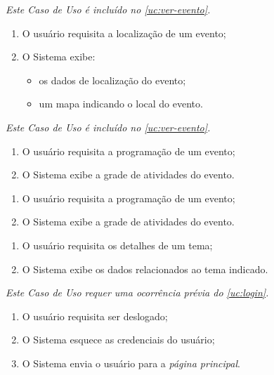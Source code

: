 \documentclass[12pt,a4paper,twoside,hyphens,english,brazil]{abntex2}
\begin{document}
{
\emph{Este Caso de Uso é incluído no \ref{uc:ver-evento}.}
\begin{enumerate}[itemsep=-1ex,topsep=-1ex]
	\item O usuário requisita a localização de um evento;
	\item O Sistema exibe:
		\begin{itemize}[itemsep=-1ex,topsep=-1ex]
			\item os dados de localização do evento;
			\item um mapa indicando o local do evento.
		\end{itemize}
\end{enumerate}

\emph{Este Caso de Uso é incluído no \ref{uc:ver-evento}.}
\begin{enumerate}[itemsep=-1ex,topsep=-1ex]
	\item O usuário requisita a programação de um evento;
	\item O Sistema exibe a grade de atividades do evento.
\end{enumerate}

\begin{enumerate}[itemsep=-1ex]
	\item O usuário requisita a programação de um evento;
	\item O Sistema exibe a grade de atividades do evento.
\end{enumerate}

\begin{enumerate}[itemsep=-1ex]
	\item O usuário requisita os detalhes de um tema;
	\item O Sistema exibe os dados relacionados ao tema indicado.
\end{enumerate}

\emph{Este Caso de Uso requer uma ocorrência prévia do \ref{uc:login}.}
\begin{enumerate}[itemsep=-1ex,topsep=-1ex]
	\item O usuário requisita ser deslogado;
	\item O Sistema esquece as credenciais do usuário;
	\item O Sistema envia o usuário para a \emph{página principal}.
\end{enumerate}

}
\end{document}
